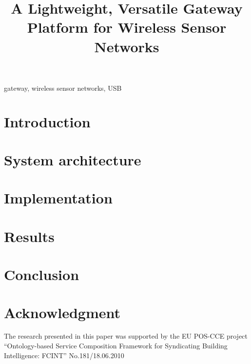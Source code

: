 \documentclass[conference]{IEEEtran}
\begin{document}
\title{A Lightweight, Versatile Gateway Platform for Wireless Sensor Networks}



\author{
  }

\maketitle

\begin{abstract} 

\cite{doroftei2007omnidirectional}
\end{abstract}

\begin{IEEEkeywords}
gateway, wireless sensor networks, USB
\end{IEEEkeywords}

\section{Introduction}
\label{sec:introduction}


\section{System architecture}
\label{sec:architecture}


\section{Implementation}
\label{sec:implementation}



\section{Results} 
\label{sec:results}


\section{Conclusion}
\label{sec:conclusion}



\section*{Acknowledgment}
\label{sec:acknowledgment}

The research presented in this paper was supported by the EU POS-CCE project
“Ontology-based Service Composition Framework for Syndicating Building
Intelligence: FCINT” No.181/18.06.2010




\end{document}
